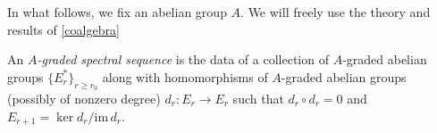 \documentclass[../main.tex]{subfiles}
\begin{document}
In what follows, we fix an abelian group $A$. We will freely use the theory and results of \autoref{coalgebra}

\begin{definition}
    An \emph{$A$-graded spectral sequence} is the data of a collection of $A$-graded abelian groups $\{E_r^*\}_{r\ge r_0}$ along with homomorphisms of $A$-graded abelian groups (possibly of nonzero degree) $d_r:E_r\to E_r$ such that $d_r\circ d_r=0$ and $E_{r+1}=\ker d_r/\mathrm{im}\,d_r$.
\end{definition}
\end{document}
